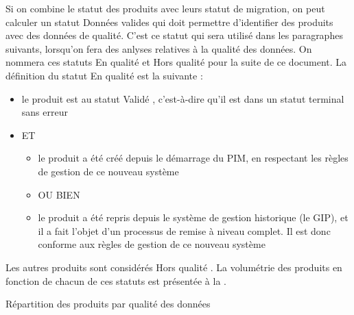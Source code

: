                 Si on combine le statut des produits avec leurs statut de migration, on peut calculer un statut \og Données valides \fg qui doit permettre d'identifier des produits avec des données de qualité.
                C'est ce statut qui sera utilisé dans les paragraphes suivants, lorsqu'on fera des anlyses relatives à la qualité des données.
                \label{def:en_qualite}
                On nommera ces statuts \og En qualité \fg et \og Hors qualité \fg pour la suite de ce document.
                La définition du statut \og En qualité \fg est la suivante : 
                \begin{itemize}
                    \item le produit est au statut \og Validé \fg, c'est-à-dire qu'il est dans un statut terminal sans erreur
                    \item ET
                    \begin{itemize}
                        \item le produit a été créé depuis le démarrage du PIM, en respectant les règles de gestion de ce nouveau système
                        \item OU BIEN
                        \item le produit a été repris depuis le système de gestion historique (le GIP), et il a fait l'objet d'un processus de remise à niveau complet. Il est donc conforme aux règles de gestion de ce nouveau système
                    \end{itemize}
                \end{itemize}
                Les autres produits sont considérés \og Hors qualité \fg.
                La volumétrie des produits en fonction de chacun de ces statuts est présentée à la .

                \begin{table}[htbp]
                    \begin{center}
                    
                    \caption{Répartition des produits par \og qualité des données \fg}
                    \label{tbl:products_quality}
                    \end{center}
                \end{table}


